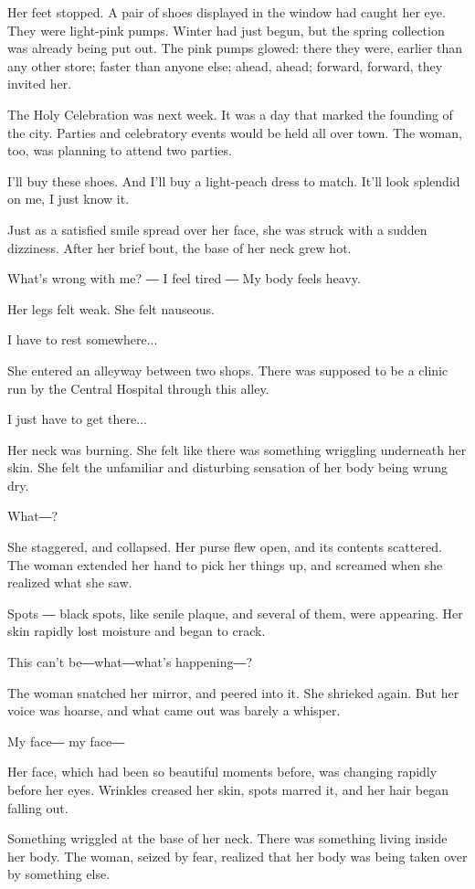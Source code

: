 Her feet stopped. A pair of shoes displayed in the window had caught her
eye. They were light-pink pumps. Winter had just begun, but the spring
collection was already being put out. The pink pumps glowed: there they
were, earlier than any other store; faster than anyone else; ahead,
ahead; forward, forward, they invited her.

The Holy Celebration was next week. It was a day that marked the
founding of the city. Parties and celebratory events would be held all
over town. The woman, too, was planning to attend two parties.

I'll buy these shoes. And I'll buy a light-peach dress to match. It'll
look splendid on me, I just know it.

Just as a satisfied smile spread over her face, she was struck with a
sudden dizziness. After her brief bout, the base of her neck grew hot.

What's wrong with me? ― I feel tired ― My body feels heavy.

Her legs felt weak. She felt nauseous.

I have to rest somewhere...

She entered an alleyway between two shops. There was supposed to be a
clinic run by the Central Hospital through this alley.

I just have to get there...

Her neck was burning. She felt like there was something wriggling
underneath her skin. She felt the unfamiliar and disturbing sensation of
her body being wrung dry.

What―?

She staggered, and collapsed. Her purse flew open, and its contents
scattered. The woman extended her hand to pick her things up, and
screamed when she realized what she saw.

Spots ― black spots, like senile plaque, and several of them, were
appearing. Her skin rapidly lost moisture and began to crack.

This can't be―what―what's happening―?

The woman snatched her mirror, and peered into it. She shrieked again.
But her voice was hoarse, and what came out was barely a whisper.

My face― my face―

Her face, which had been so beautiful moments before, was changing
rapidly before her eyes. Wrinkles creased her skin, spots marred it, and
her hair began falling out.

Something wriggled at the base of her neck. There was something living
inside her body. The woman, seized by fear, realized that her body was
being taken over by something else.

